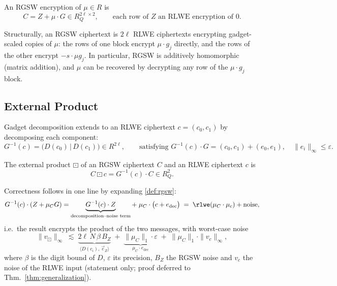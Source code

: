 \begin{definition}
    An RGSW encryption of $\mu \in R$ is
    \begin{equation}
        \label{def:rgsw}
        C = Z + \mu\cdot G \in R_Q^{2\ell \times 2},
        \qquad \text{each row of } Z \text{ an RLWE encryption of } 0.
    \end{equation}
\end{definition}

Structurally, an RGSW ciphertext is $2\ell$ RLWE ciphertexts encrypting gadget-scaled copies of $\mu$: the rows of one block encrypt $\mu\cdot g_j$ directly, and the rows of the other encrypt $-s\cdot\mu g_j$. In particular, RGSW is additively homomorphic (matrix addition), and $\mu$ can be recovered by decrypting any row of the $\mu\cdot g_j$ block.

\subsection{External Product}
Gadget decomposition extends to an RLWE ciphertext $c = (c_0, c_1)$ by decomposing each component:
\begin{equation}
    G^{-1}(c) = \big(D(c_0) \,\big|\, D(c_1)\big) \in R^{2\ell},
    \qquad \text{satisfying } G^{-1}(c)\cdot G = (c_0, c_1) + (e_0, e_1),
    \quad \|e_i\|_\infty \le \varepsilon.
\end{equation}

\begin{definition}
    The external product $\boxdot$ of an RGSW ciphertext $C$ and an RLWE ciphertext $c$ is~\cite{cryptoeprint:2016/870, cryptoeprint:2016/339}
    \begin{equation}
        \label{eq:ext_prod}
        C \boxdot c = G^{-1}(c) \cdot C \in R_Q^2.
    \end{equation}
\end{definition}

Correctness follows in one line by expanding \eqref{def:rgsw}:
\begin{equation*}
    G^{-1}(c)\cdot(Z + \mu_C G)
    = \underbrace{G^{-1}(c)\cdot Z}_{\text{decomposition--noise term}}
    + \;\mu_C\cdot\big(c + e_{\mathrm{dec}}\big)
    \;=\; \rlwe(\mu_C \cdot \mu_c) + \text{noise},
\end{equation*}
i.e.\ the result encrypts the product of the two messages, with worst-case noise
\begin{equation}
    \label{eq:ext_prod_noise}
    \|v_{\boxdot}\|_\infty \;\lesssim\;
    \underbrace{2\ell\, N\, \beta\, B_{Z}}_{\langle D(c_i),\, \vec{e}_Z\rangle}
    \;+\;
    \underbrace{\|\mu_C\|_1 \cdot \varepsilon}_{\mu_C \cdot e_{\mathrm{dec}}}
    \;+\; \|\mu_C\|_1 \cdot \|v_c\|_\infty,
\end{equation}
where $\beta$ is the digit bound of $D$, $\varepsilon$ its precision, $B_Z$ the RGSW noise and $v_c$ the noise of the RLWE input (statement only; proof deferred to Thm.~\ref{thm:generalization}).

